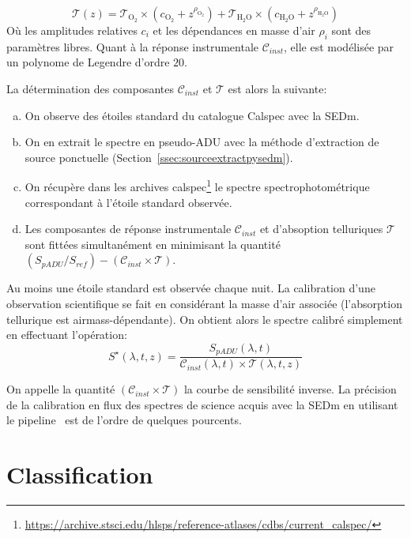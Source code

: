 \documentclass[../main/main.tex]{subfiles}
\begin{document}
\begin{equation}
  \label{eq:telluricpysedm}
  \mathcal{T}(z) =
  \mathcal{T}_{\text{O}_{2}}\times(c_{\text{O}_{2}}+z^{\rho_{\text{O}_{2}}})
  + \mathcal{T}_{\text{H}_{2}\text{O}}\times(c_{\text{H}_{2}\text{O}}+z^{\rho_{\text{H}_{2}\text{O}}})
\end{equation}
Où les amplitudes relatives $c_{i}$ et les dépendances en masse d'air
$\rho_{i}$ sont des paramètres libres. Quant à la réponse instrumentale
$\mathcal{C}_{inst}$, elle est modélisée par un polynome de Legendre d'ordre $20$.

La détermination des composantes $\mathcal{C}_{inst}$ et $\mathcal{T}$ est alors la suivante:

\begin{enumerate}[(a)]
  \itemsep=0em
\item On observe des étoiles standard du catalogue Calspec
  \citep{Bohlinstdcalpsec} avec la SEDm.
\item On en extrait le spectre en pseudo-ADU avec la méthode
  d'extraction de source ponctuelle
  (Section~\ref{ssec:sourceextractpysedm}).
\item On récupère dans les archives calspec\footnote{\url{https://archive.stsci.edu/hlsps/reference-atlases/cdbs/current_calspec/}} le spectre
  spectrophotométrique correspondant à l'étoile standard observée.
\item Les composantes de réponse instrumentale $\mathcal{C}_{inst}$ et
  d'absoption telluriques $\mathcal{T}$ sont fittées simultanément en
  minimisant la quantité ~$(S_{pADU}/S_{ref}) - (\mathcal{C}_{inst}\times\mathcal{T})$.
\end{enumerate}

Au moins une étoile standard est observée chaque nuit. La calibration
d'une observation scientifique se fait en considérant la masse d'air
associée (l'absorption tellurique est airmass-dépendante). On obtient
alors le spectre calibré simplement en effectuant l'opération:
\begin{equation*}
  S^{\star}(\lambda,t,z)=\frac{S_{pADU}(\lambda,t)}{\mathcal{C}_{inst}(\lambda,t)\times\mathcal{T}(\lambda,t,z)}
\end{equation*}

On appelle la quantité $(\mathcal{C}_{inst}\times\mathcal{T})$ la courbe de
sensibilité inverse.
La précision de la calibration en flux des spectres de science acquis
avec la SEDm en utilisant le pipeline \pysedm\ est de l'ordre de quelques pourcents.

\section{Classification}\label{sec:snid}
\end{document}
